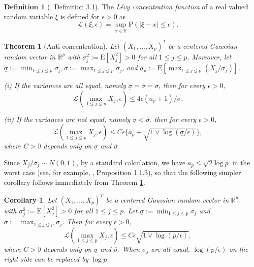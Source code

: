 \documentclass[11pt,reqno]{amsart}
\newtheorem{theorem}{Theorem}
\newtheorem{corollary}{Corollary}
\theoremstyle{definition}
\newtheorem{definition}{Definition}
\newcommand{\LL}{ \mathcal{L}}
\newcommand{\Ep}{{\mathrm{E}}}
\renewcommand{\Pr}{{\mathrm{P}}}
\newcommand{\RR}{\mathbb{R}}
\begin{document}
\begin{definition}[\cite{RV09}, Definition 3.1]
\label{def: levy concentration}
The {\em L\'{e}vy concentration function} of a real valued random variable $\xi$ is defined for $\epsilon > 0$ as
\begin{equation*}
\LL (\xi,\epsilon) = \sup_{x \in \RR} \Pr ( | \xi - x | \leq \epsilon ).
\end{equation*}
\end{definition}


 \begin{theorem}[Anti-concentration]\label{thm: anticoncentration}
Let $(X_{1},\dots,X_{p})^{T}$ be a  centered Gaussian random vector in $\RR^{p}$ with $\sigma_{j}^{2} := \Ep [ X_{j}^{2} ]>0$ for all $1 \leq j \leq p$. Moreover, let
$\underline{\sigma} := \min_{1 \leq j \leq p} \sigma_{j}, \overline{\sigma} := \max_{1 \leq j \leq p} \sigma_{j}$, and $a_{p} := \Ep [ \max_{1 \leq j \leq p} (X_{j}/\sigma_{j}) ]$.

(i) If the variances are all equal, namely $\underline{\sigma} = \overline{\sigma} = \sigma$, then for every $\epsilon > 0$,
\begin{equation*}
\LL (\max_{1 \leq j \leq p} X_{j},\epsilon) \leq 4 \epsilon (a_p + 1)/\sigma.
\end{equation*}

(ii)  If the variances are not equal, namely $\underline{\sigma} < \overline{\sigma}$, then for every $\epsilon > 0$,
\begin{equation*}
\LL (\max_{1 \leq j \leq p} X_{j},\epsilon)  \leq C \epsilon \{ a_p + \sqrt{1 \vee \log (\underline{\sigma}/\epsilon)} \},
\end{equation*}
where $C>0$ depends only on $\underline{\sigma}$ and $\overline{\sigma}$.
\end{theorem}

Since $X_{j}/\sigma_{j} \sim N(0,1)$, by a standard calculation, we have $a_{p} \leq \sqrt{2 \log p}$ in the worst case
(see, for example, \cite{Talagrand2003}, Proposition 1.1.3), so that
the following simpler corollary  follows immediately from Theorem \ref{thm: anticoncentration}.

 \begin{corollary}\label{cor: anticoncentration}
Let $(X_{1},\dots,X_{p})^{T}$ be a  centered Gaussian random vector in $\RR^{p}$ with $\sigma_{j}^{2} := \Ep [ X_{j}^{2} ]  > 0$ for all $1 \leq j \leq p$.
Let $\underline{\sigma} := \min_{1 \leq j \leq p} \sigma_{j}$ and $\overline{\sigma} := \max_{1 \leq j \leq p} \sigma_{j}$. Then for every $\epsilon > 0$,
\begin{equation*}
\LL (\max_{1 \leq j \leq p} X_{j},\epsilon)  \leq C \epsilon  \sqrt{1 \vee \log (p/\epsilon )},
\end{equation*}
where $C>0$ depends only on $\underline{\sigma}$ and $\overline{\sigma}$.
When $\sigma_{j}$ are all equal,  $\log (p/\epsilon)$ on the right side can be replaced by $\log p$.
\end{corollary}
\end{document}
